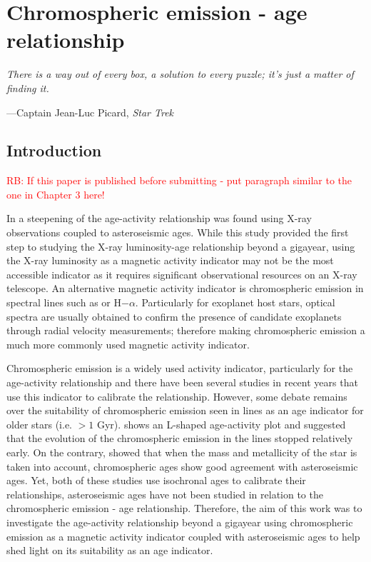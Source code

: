 
\chapter{Chromospheric emission - age relationship} %

\label{Chapter4} %

\epigraph{\itshape There is a way out of every box, a solution to every puzzle; it's just a matter of finding it.}{---Captain Jean-Luc Picard, \itshape Star Trek}

\section{Introduction}
\textcolor{red}{RB: If this paper is published before submitting - put paragraph similar to the one in Chapter 3 here!}

In \citet{Booth_etal_2017} a steepening of the age-activity relationship was found using X-ray observations coupled to asteroseismic ages. While this study provided the first step to studying the X-ray luminosity-age relationship beyond a gigayear, using the X-ray luminosity as a magnetic activity indicator may not be the most accessible indicator as it requires significant observational resources on an X-ray telescope. An alternative magnetic activity indicator is chromospheric emission in spectral lines such as \caII or H$-\alpha$. Particularly for exoplanet host stars, optical spectra are usually obtained to confirm the presence of candidate exoplanets through radial velocity measurements; therefore making chromospheric emission a much more commonly used magnetic activity indicator.

Chromospheric emission is a widely used activity indicator, particularly for the age-activity relationship and there have been several studies in recent years that use this indicator to calibrate the relationship. However, some debate remains over the suitability of chromospheric emission seen in \caII lines as an age indicator for older stars (i.e. $> 1$ Gyr). \citet{Pace_2013} shows an L-shaped age-activity plot and suggested that the evolution of the chromospheric emission in the \caII lines stopped relatively early. On the contrary, \citet{Lorenzo_Oliveira_etal_2016} showed that when the mass and metallicity of the star is taken into account, chromospheric ages show good agreement with asteroseismic ages. Yet, both of these studies use isochronal ages to calibrate their relationships, asteroseismic ages have not been studied in relation to the chromospheric emission - age relationship. Therefore, the aim of this work was to investigate the age-activity relationship beyond a gigayear using chromospheric emission as a magnetic activity indicator coupled with asteroseismic ages to help shed light on its suitability as an age indicator.

